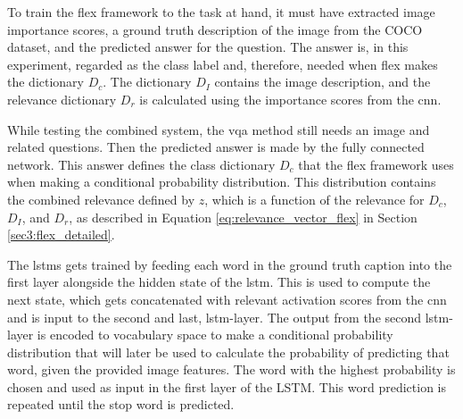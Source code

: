         To train the \gls{flex} framework to the task at hand, it must have extracted image importance scores, a ground truth description of the image from the COCO dataset, and the predicted answer for the question. 
        The answer is, in this experiment, regarded as the class label and, therefore, needed when \gls{flex} makes the dictionary $D_c$. The dictionary $D_I$ contains the image description, and the relevance dictionary $D_r$ is calculated using the importance scores from the \gls{cnn}.

        While testing the combined system, the \gls{vqa} method still needs an image and related questions. Then the predicted answer is made by the fully connected network. This answer defines the class dictionary $D_c$ that the \gls{flex} framework uses when making a conditional probability distribution. This distribution contains the combined relevance defined by $z$, which is a function of the relevance for $D_c$, $D_I$, and $D_r$, as described in Equation \ref{eq:relevance_vector_flex} in Section \ref{sec3:flex_detailed}.

        The \glspl{lstm} gets trained by feeding each word in the ground truth caption into the first layer alongside the hidden state of the \gls{lstm}. This is used to compute the next state, which gets concatenated with relevant activation scores from the \gls{cnn} and is input to the second and last, \gls{lstm}-layer. 
        The output from the second \gls{lstm}-layer is encoded to vocabulary space to make a conditional probability distribution that will later be used to calculate the probability of predicting that word, given the provided image features. The word with the highest probability is chosen and used as input in the first layer of the LSTM.
        This word prediction is repeated until the stop word is predicted. 
        


    
            
